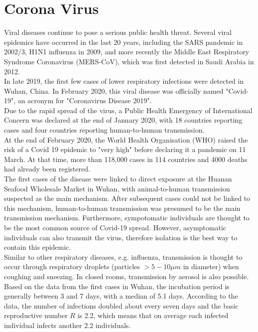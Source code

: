 \section{Corona Virus}
\label{sec:corona}
Viral diseases continue to pose a serious public health threat. Several viral epidemics have occurred in the last 20 years, including the SARS pandemic in 2002/3, H1N1 influenza in 2009, and more recently the Middle East Respiratory Syndrome Coronavirus (MERS-CoV), which was first detected in Saudi Arabia in 2012. \\
In late 2019, the first few cases of lower respiratory infections were detected in Wuhan, China. In February 2020, this viral disease was officially named "Covid-19", an acronym for "Coronavirus Disease 2019". \\
Due to the rapid spread of the virus, a Public Health Emergency of International Concern was declared at the end of January 2020, with 18 countries reporting cases and four countries reporting human-to-human transmission. \\
At the end of February 2020, the World Health Organisation (WHO) raised the risk of a Covid 19 epidemic to "very high" before declaring it a pandemic on 11 March. At that time, more than 118,000 cases in 114 countries and 4000 deaths had already been registered. \\
The first cases of the disease were linked to direct exposure at the Huanan Seafood Wholesale Market in Wuhan, with animal-to-human transmission suspected as the main mechanism. After subsequent cases could not be linked to this mechanism, human-to-human transmission was presumed to be the main transmission mechanism. Furthermore, sympotomatic individuals are thought to be the most common source of Covid-19 spread. However, asymptomatic individuals can also transmit the virus, therefore isolation is the best way to contain this epidemic. \\
Similar to other respiratory diseases, e.g. influenza, transmission is thought to occur through respiratory droplets (particles $>5-10\mu m$ in diameter) when coughing and sneezing. In closed rooms, transmission by aerosol is also possible. \\
Based on the data from the first cases in Wuhan, the incubation period is generally between 3 and 7 days, with a median of 5.1 days. According to the data, the number of infections doubled about every seven days and the basic reproductive number $R$ is 2.2, which means that on average each infected individual infects another 2.2 individuals. \\
